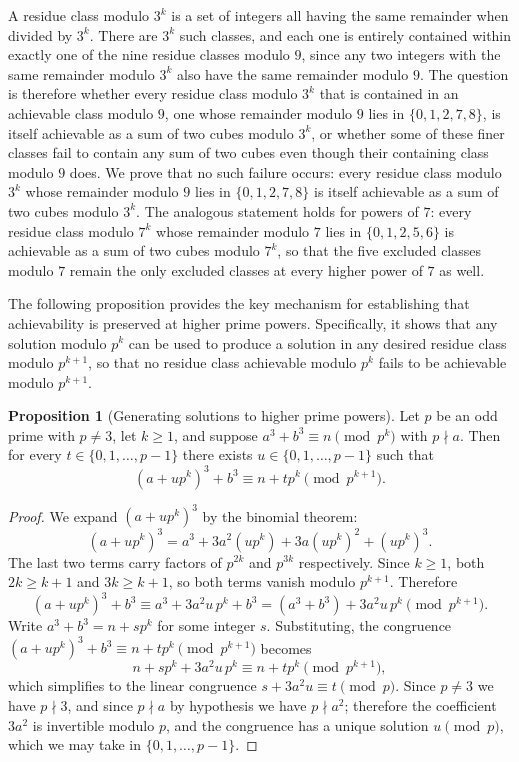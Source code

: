 \documentclass[12pt]{amsart}
\theoremstyle{definition}
\newtheorem{proposition}[theorem]{Proposition}
\theoremstyle{remark}
\begin{document}
\medskip
A residue class modulo $3^k$ is a set of integers all 
having the same remainder when divided by $3^k$. There are $3^k$ such 
classes, and each one is entirely contained within exactly one of the 
nine residue classes modulo $9$, since any two integers with the same 
remainder modulo $3^k$ also have the same remainder modulo $9$. The 
question is therefore whether every residue class modulo $3^k$ that 
is contained in an achievable class modulo $9$, one whose remainder 
modulo $9$ lies in $\{0,1,2,7,8\}$, is itself achievable as a sum 
of two cubes modulo $3^k$, or whether some of these finer classes 
fail to contain any sum of two cubes even though their containing 
class modulo $9$ does. We prove that no such failure occurs: every 
residue class modulo $3^k$ whose remainder modulo $9$ lies in 
$\{0,1,2,7,8\}$ is itself achievable as a sum of two cubes modulo 
$3^k$. The analogous statement holds for powers of $7$: every 
residue class modulo $7^k$ whose remainder modulo $7$ lies in 
$\{0,1,2,5,6\}$ is achievable as a sum of two cubes modulo $7^k$, 
so that the five excluded classes modulo $7$ remain the only excluded 
classes at every higher power of $7$ as well.

\medskip
The following proposition provides the key mechanism for establishing that 
achievability is preserved at higher prime powers. Specifically, it shows that any solution modulo $p^k$ 
can be used to produce a solution in any desired residue class modulo 
$p^{k+1}$, so that no residue class achievable modulo $p^k$ fails 
to be achievable modulo $p^{k+1}$.

\begin{proposition}[Generating solutions to higher prime powers]
\label{prop:lifting}
Let $p$ be an odd prime with $p \ne 3$, let $k \ge 1$, and suppose
$a^3 + b^3 \equiv n \pmod{p^k}$ with $p \nmid a$. Then for every
$t \in \{0, 1, \ldots, p-1\}$ there exists $u \in \{0, 1, \ldots, p-1\}$
such that
\[
(a + up^k)^3 + b^3 \equiv n + tp^k \pmod{p^{k+1}}.
\]
\end{proposition}

\begin{proof}
We expand $(a + up^k)^3$ by the binomial theorem:
\[
(a + up^k)^3 = a^3 + 3a^2(up^k) + 3a(up^k)^2 + (up^k)^3.
\]
The last two terms carry factors of $p^{2k}$ and $p^{3k}$ respectively.
Since $k \ge 1$, both $2k \ge k+1$ and $3k \ge k+1$, so both terms
vanish modulo $p^{k+1}$. Therefore
\[
(a + up^k)^3 + b^3 \equiv a^3 + 3a^2 u\, p^k + b^3
= (a^3 + b^3) + 3a^2 u\, p^k \pmod{p^{k+1}}.
\]
Write $a^3 + b^3 = n + sp^k$ for some integer $s$. Substituting, the
congruence $(a + up^k)^3 + b^3 \equiv n + tp^k \pmod{p^{k+1}}$ becomes
\[
n + sp^k + 3a^2 u\, p^k \equiv n + tp^k \pmod{p^{k+1}},
\]
which simplifies to the linear congruence $s + 3a^2 u \equiv t \pmod{p}$.
Since $p \ne 3$ we have $p \nmid 3$, and since $p \nmid a$ by hypothesis
we have $p \nmid a^2$; therefore the coefficient $3a^2$ is invertible
modulo $p$, and the congruence has a unique solution $u \pmod{p}$, which
we may take in $\{0, 1, \ldots, p-1\}$.
\end{proof}
\end{document}
